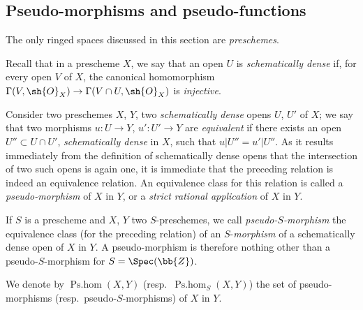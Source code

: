 \subsection{Pseudo-morphisms and pseudo-functions}
\label{IV.20.2}

The only ringed spaces discussed in this section are \emph{preschemes}.

\begin{env}[20.2.1]
\label{IV.20.2.1}
Recall  that in a prescheme $X$, we say that an open $U$ is \emph{schematically dense} if, for every open $V$ of $X$, the canonical homomorphism $\Gamma(V,\sh{O}_X)\to\Gamma(V\cap U,\sh{O}_X)$ is \emph{injective}.

Consider two preschemes $X$, $Y$, two \emph{schematically dense} opens $U$, $U'$ of $X$;
we say that two morphisms $u:U\to Y$, $u':U'\to Y$ are \emph{equivalent} if there exists an open $U''\subset U\cap U'$, \emph{schematically dense} in $X$, such that $u|U''=u'|U''$.
As it results immediately from the definition of schematically dense opens that the intersection of two such opens is again one, it is immediate that the preceding relation is indeed an equivalence relation.
An equivalence class for this relation is called a \emph{pseudo-morphism} of $X$ in $Y$, or a \emph{strict rational application} of $X$ in $Y$.

If $S$ is a prescheme and $X$, $Y$ two $S$-preschemes, we call \emph{pseudo-$S$-morphism} the equivalence class (for the preceding relation) of an $S$-\emph{morphism} of a schematically dense open of $X$ in $Y$.
A pseudo-morphism is therefore nothing other than a pseudo-$S$-morphism for $S=\Spec(\bb{Z})$.

We denote by $\operatorname{Ps.hom}(X,Y)$ (resp.\ $\operatorname{Ps.hom}_S(X,Y)$) the set of pseudo-morphisms (resp.\ pseudo-$S$-morphisms) of $X$ in $Y$.
\end{env}

